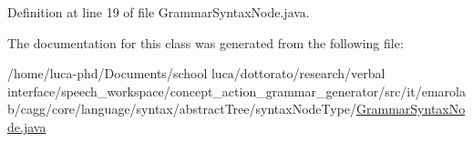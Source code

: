 Definition at line 19 of file Grammar\-Syntax\-Node.\-java.



The documentation for this class was generated from the following file\-:\begin{DoxyCompactItemize}
\item 
/home/luca-\/phd/\-Documents/school luca/dottorato/research/verbal interface/speech\-\_\-workspace/concept\-\_\-action\-\_\-grammar\-\_\-generator/src/it/emarolab/cagg/core/language/syntax/abstract\-Tree/syntax\-Node\-Type/\hyperlink{GrammarSyntaxNode_8java}{Grammar\-Syntax\-Node.\-java}\end{DoxyCompactItemize}
